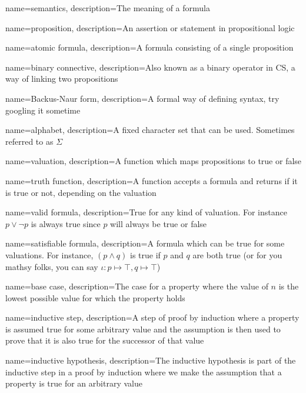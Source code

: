 {
    name={semantics},
    description={The meaning of a formula}
}

{
    name={proposition},
    description={An assertion or statement in propositional logic}
}

{
    name={atomic formula},
    description={A formula consisting of a single proposition}
}

{
    name={binary connective},
    description={Also known as a binary operator in CS, a way of linking two propositions}
}

{
    name={Backus-Naur form},
    description={A formal way of defining syntax, try googling it sometime}
}

{
    name={alphabet},
    description={A fixed character set that can be used. Sometimes referred to as $\Sigma$}
}

{
    name={valuation},
    description={A function which maps propositions to true or false}
}

{
    name={truth function},
    description={A function accepts a formula and returns if it is true or not, depending on the valuation}
}

{
    name={valid formula},
    description={True for any kind of valuation. For instance $p \lor \neg p$ is always true since $p$ will always be true or false}
}

{
    name={satisfiable formula},
    description={A formula which can be true for some valuations. For instance, $(p \land q)$ is true if $p$ and $q$ are both true (or for you mathsy folks, you can say $\iota: p \mapsto \top, q \mapsto \top$)}
}

{
    name={base case},
    description={The case for a property where the value of $n$ is the lowest possible value for which the property holds}
}

{
    name={inductive step},
    description={A step of proof by induction where a property is assumed true for some arbitrary value and the assumption is then used to prove that it is also true for the successor of that value}
}

{
    name={inductive hypothesis},
    description={The inductive hypothesis is part of the inductive step in a proof by induction where we make the assumption that a property is true for an arbitrary value}
}
